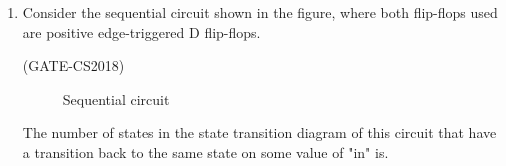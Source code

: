 \documentclass[tikz]{standalone}
\begin{document}
\begin{enumerate}

\item Consider the sequential circuit shown in the figure, where both flip-flops used are positive edge-triggered D flip-flops.

\hfill(GATE-CS2018)
\begin{figure}
	\centering
	
	\caption{Sequential circuit}
	\label{fig:enter-label}
\end{figure}
The number of states in the state transition diagram of this circuit that have a transition back to the same state on some value of "in" is.
\end{enumerate}
\end{document}
